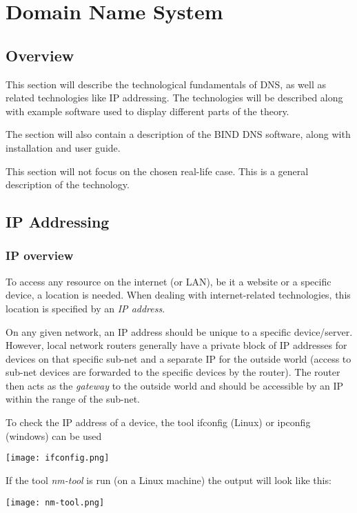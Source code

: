 \chapter{Domain Name System}
\section{Overview}
This section will describe the technological fundamentals of DNS, as well as related technologies like IP addressing. The technologies will be described along with example software used to display different parts of the theory.

The section will also contain a description of the BIND DNS software, along with installation and user guide. 

This section will not focus on the chosen real-life case. This is a general description of the technology.
\section{IP Addressing}
\subsection{IP overview}
To access any resource on the internet (or LAN), be it a website or a specific device, a location is needed. When dealing with internet-related technologies, this location is specified by an \textit{IP address}. 

On any given network, an IP address should be unique to a specific device/server. However, local network routers generally have a private block of IP addresses for devices on that specific sub-net and a separate IP for the outside world (access to sub-net devices are forwarded to the specific devices by the router).
The router then acts as the \textit{gateway} to the outside world and should be accessible by an IP within the range of the sub-net.

To check the IP address of a device, the tool ifconfig (Linux) or ipconfig (windows) can be used

\begin{center}
	\texttt{[image: ifconfig.png]}
\end{center}

If the tool \textit{nm-tool} is run (on a Linux machine) the output will look like this:

\begin{center}
	\texttt{[image: nm-tool.png]}
\end{center}

